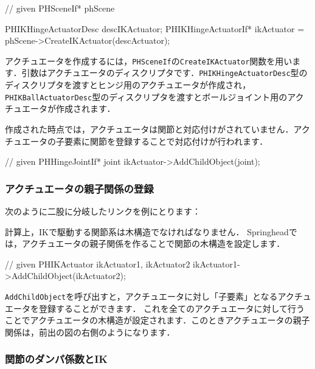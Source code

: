 \begin{sourcecode}
// given PHSceneIf* phScene

PHIKHingeActuatorDesc descIKActuator;
PHIKHingeActuatorIf* ikActuator
    = phScene->CreateIKActuator(descActuator);
\end{sourcecode}
\KLUDGE アクチュエータを作成するには，\texttt{PHSceneIf}\KLUDGE の\texttt{CreateIKActuator}\KLUDGE 関数を用います．引数はアクチュエータのディスクリプタです．\texttt{PHIKHingeActuatorDesc}\KLUDGE 型のディスクリプタを渡すとヒンジ用のアクチュエータが作成され，\texttt{PHIKBallActuatorDesc}\KLUDGE 型のディスクリプタを渡すとボールジョイント用のアクチュエータが作成されます．

\KLUDGE 作成された時点では，アクチュエータは関節と対応付けがされていません．アクチュエータの子要素に関節を登録することで対応付けが行われます．
\begin{sourcecode}
// given PHHingeJointIf* joint
ikActuator->AddChildObject(joint);
\end{sourcecode}


\subsubsection*{\KLUDGE アクチュエータの親子関係の登録}

\KLUDGE 次のように二股に分岐したリンクを例にとります：

\begin{center}
\end{center}

\KLUDGE 計算上，IK\KLUDGE で駆動する関節系は木構造でなければなりません．
Springhead\KLUDGE では，アクチュエータの親子関係を作ることで関節の木構造を設定します．

\begin{sourcecode}
// given PHIKActuator ikActuator1, ikActuator2
ikActuator1->AddChildObject(ikActuator2);
\end{sourcecode}
\texttt{AddChildObject}\KLUDGE を呼び出すと，アクチュエータに対し「子要素」となるアクチュエータを登録することができます．
\KLUDGE これを全てのアクチュエータに対して行うことでアクチュエータの木構造が設定されます．このときアクチュエータの親子関係は，前出の図の右側のようになります．


\subsubsection*{\KLUDGE 関節のダンパ係数とIK}

